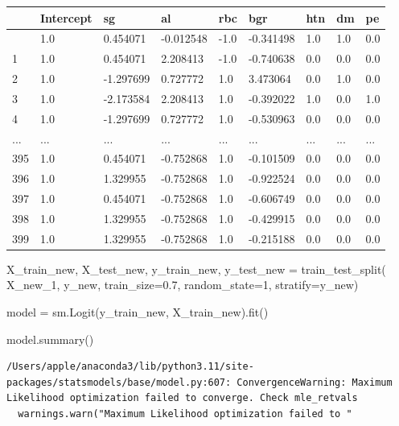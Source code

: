 \documentclass[
  11pt,
  letterpaper,
  DIV=11,
  numbers=noendperiod]{scrartcl}
\newenvironment{Shaded}{\begin{snugshade}}{\end{snugshade}}
\newcommand{\DecValTok}[1]{\textcolor[rgb]{0.68,0.00,0.00}{#1}}
\newcommand{\FloatTok}[1]{\textcolor[rgb]{0.68,0.00,0.00}{#1}}
\newcommand{\NormalTok}[1]{\textcolor[rgb]{0.00,0.23,0.31}{#1}}
\newcommand{\OperatorTok}[1]{\textcolor[rgb]{0.37,0.37,0.37}{#1}}
\begin{document}
\begin{longtable}[]{@{}lllllllll@{}}
\toprule\noalign{}
& Intercept & sg & al & rbc & bgr & htn & dm & pe \\
\midrule\noalign{}
\endhead
\bottomrule\noalign{}
\endlastfoot
0 & 1.0 & 0.454071 & -0.012548 & -1.0 & -0.341498 & 1.0 & 1.0 & 0.0 \\
1 & 1.0 & 0.454071 & 2.208413 & -1.0 & -0.740638 & 0.0 & 0.0 & 0.0 \\
2 & 1.0 & -1.297699 & 0.727772 & 1.0 & 3.473064 & 0.0 & 1.0 & 0.0 \\
3 & 1.0 & -2.173584 & 2.208413 & 1.0 & -0.392022 & 1.0 & 0.0 & 1.0 \\
4 & 1.0 & -1.297699 & 0.727772 & 1.0 & -0.530963 & 0.0 & 0.0 & 0.0 \\
... & ... & ... & ... & ... & ... & ... & ... & ... \\
395 & 1.0 & 0.454071 & -0.752868 & 1.0 & -0.101509 & 0.0 & 0.0 & 0.0 \\
396 & 1.0 & 1.329955 & -0.752868 & 1.0 & -0.922524 & 0.0 & 0.0 & 0.0 \\
397 & 1.0 & 0.454071 & -0.752868 & 1.0 & -0.606749 & 0.0 & 0.0 & 0.0 \\
398 & 1.0 & 1.329955 & -0.752868 & 1.0 & -0.429915 & 0.0 & 0.0 & 0.0 \\
399 & 1.0 & 1.329955 & -0.752868 & 1.0 & -0.215188 & 0.0 & 0.0 & 0.0 \\
\end{longtable}

\begin{Shaded}
\begin{Highlighting}[]
\NormalTok{X\_train\_new, X\_test\_new, y\_train\_new, y\_test\_new }\OperatorTok{=}\NormalTok{ train\_test\_split(}
\NormalTok{    X\_new\_1, y\_new, train\_size}\OperatorTok{=}\FloatTok{0.7}\NormalTok{, random\_state}\OperatorTok{=}\DecValTok{1}\NormalTok{, stratify}\OperatorTok{=}\NormalTok{y\_new)}

\NormalTok{model }\OperatorTok{=}\NormalTok{ sm.Logit(y\_train\_new, X\_train\_new).fit()}

\NormalTok{model.summary()}
\end{Highlighting}
\end{Shaded}

\begin{verbatim}
/Users/apple/anaconda3/lib/python3.11/site-packages/statsmodels/base/model.py:607: ConvergenceWarning: Maximum Likelihood optimization failed to converge. Check mle_retvals
  warnings.warn("Maximum Likelihood optimization failed to "
\end{verbatim}
\end{document}
